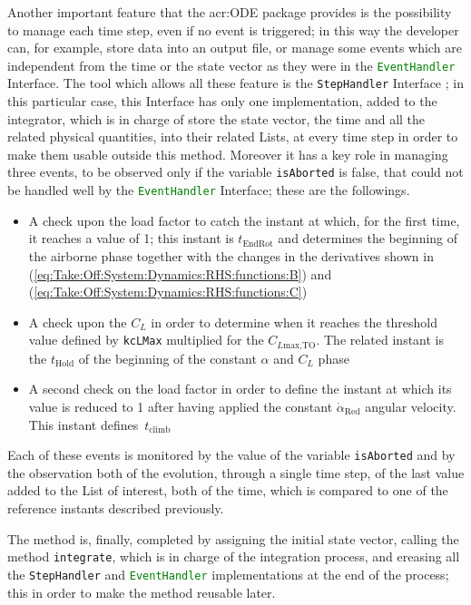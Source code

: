 \bigskip
\noindent
Another important feature that the \gls{acr:ODE} package provides is the possibility to manage each time step, even if no event is triggered; in this way the developer can, for example, store data into an output file, or manage some events which are independent from the time or the state vector as they were in the \lstinline[language=Java]!EventHandler! \gls{Interface}. The tool which allows all these feature is the \lstinline[language=Java]!StepHandler! \gls{Interface} \cite{apache:ode}; in this particular case, this \gls{Interface} has only one implementation, added to the integrator, which is in charge of store the state vector, the time and all the related physical quantities, into their related \gls{List}s, at every time step in order to make them usable outside this method. Moreover it has a key role in managing three events, to be observed only if the variable \lstinline[language=Java]!isAborted! is false, that could not be handled well by the \lstinline[language=Java]!EventHandler! \gls{Interface}; these are the followings.
%
\begin{itemize}
\item A check upon the load factor to catch the instant at which, for the first time, it reaches a value of 1; this instant is $t_{\text{EndRot}}$ and determines the beginning of the airborne phase together with the changes in the derivatives shown in (\ref{eq:Take:Off:System:Dynamics:RHS:functions:B}) and (\ref{eq:Take:Off:System:Dynamics:RHS:functions:C})
\item A check upon the $C_L$ in order to determine when it reaches the threshold value defined by \lstinline[language=Java]!kcLMax! multiplied for the $C_{L\text{max,TO}}$. The related instant is the $t_{\text{Hold}}$ of the beginning of the constant $\alpha$ and $C_L$ phase
\item A second check on the load factor in order to define the instant at which its value is reduced to 1 after having applied the constant $\dot\alpha_{\text{Red}}$ angular velocity. This instant defines~$t_{\text{climb}}$ 
\end{itemize}
%
Each of these events is monitored by the value of the variable \lstinline[language=Java]!isAborted! and by the observation both of the evolution, through a single time step, of the last value added to the \gls{List} of interest, both of the time, which is compared to one of the reference instants described previously.

\bigskip
\noindent
The method is, finally, completed by assigning the initial state vector, calling the method \lstinline[language=Java]!integrate!, which is in charge of the integration process, and ereasing all the \lstinline[language=Java]!StepHandler! and \lstinline[language=Java]!EventHandler! implementations at the end of the process; this in order to make the method reusable later.

